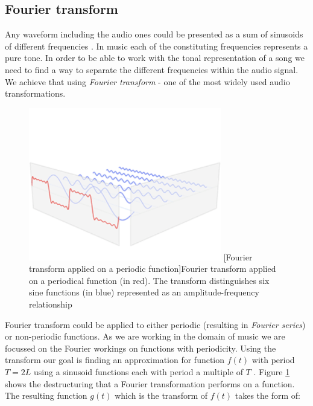 \subsection{Fourier transform}
\label{subsec:fourier}
Any waveform including the audio ones could be presented as a sum of sinusoids
of different frequencies \cite{fouriertransform}. In music each of the
constituting frequencies represents a pure tone. In order to be able to work
with the tonal representation of a song we need to find a way to separate the
different frequencies within the audio signal. We achieve that using
\textit{Fourier transform} - one of the most widely used audio transformations.

\begin{figure}[H]
    \centering
    \includegraphics[width=0.75\textwidth]{BackgroundTheory/fourier-series.png}
    [Fourier transform applied on a periodic function]{Fourier transform applied on a periodical function (in red). The transform distinguishes six sine functions (in blue) represented as an amplitude-frequency relationship \cite{fourierseries}}
    \label{fig:fourierseriesimage}
\end{figure}

Fourier transform could be applied to either periodic (resulting in
\textit{Fourier series}) or non-periodic functions. As we are working in the
domain of music we are focussed on the Fourier workings on functions with
periodicity. Using the transform our goal is finding an approximation for
function $f(t)$ with period $T=2L$ using a sinusoid functions each with period a
multiple of $T$ \cite{fourierseries}. Figure \ref{fig:fourierseriesimage} shows
the destructuring that a Fourier transformation performs on a function. The
resulting function $g(t)$ which is the transform of $f(t)$ takes the form of:

